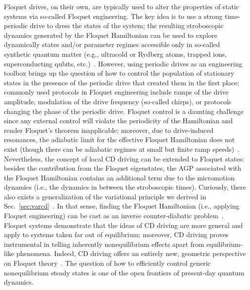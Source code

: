 Floquet drives, on their own, are typically used to alter the properties of static systems via so-called Floquet engineering. The key idea is to use a strong time-periodic drive to dress the states of the system; the resulting stroboscopic dynamics generated by the Floquet Hamiltonian can be used to explore dynamically states and/or parameter regimes accessible only in so-called synthetic quantum matter (e.g., ultracold or Rydberg atoms, trapped ions, superconducting qubits, etc.)~\cite{Goldman2014_FloquetGaugeFields,Bukov_2015_general_HFE,Eckardt2017_FloquetGases_Review,Aidelsburger2018_Review,Oka2019_FloquetMaterials,Weitenberg2021_FloquetGases}. However, using periodic drives as an engineering toolbox brings up the question of how to control the population of stationary states in the presence of the periodic drive that created them in the first place; commonly used protocols in Floquet engineering include ramps of the drive amplitude, modulation of the drive frequency (so-called chirps), or protocols changing the phase of the periodic drive. 
Floquet control is a daunting challenge since any external control will violate the periodicity of the Hamiltonian and render Floquet's theorem inapplicable; moreover, due to drive-induced resonances, the adiabatic limit for the effective Floquet Hamiltonian does not exist (though there can be adiabatic regimes at small but finite ramp speeds)~\cite{eckardt2008avoided,weinberg2017adiabatic}. Nevertheless, the concept of local CD driving can be extended to Floquet states: besides the contribution from the Floquet eigenstates, the AGP associated with the Floquet Hamiltonian contains an additional term due to the micromotion dynamics (i.e., the dynamics in between the stroboscopic times). Curiously, there also exists a generalization of the variational principle we derived in Sec.~\ref{sec:varcd}~\cite{schindler2024counterdiabatic}. In that sense, finding the Floquet Hamiltonian (i.e., applying Floquet engineering) can be cast as an inverse counter-diabatic problem~\cite{schindler2024geometric}.
Floquet systems demonstrate that the ideas of CD driving are more general and apply to systems taken far out of equilibrium; moreover, CD driving proves instrumental in telling inherently nonequilibrium effects apart from equilibrium-like phenomena. Indeed, CD driving offers an entirely new, geometric perspective on Floquet theory~\cite{schindler2024geometric}. The question of how to efficiently control generic nonequilibrium steady states is one of the open frontiers of present-day quantum dynamics.  


